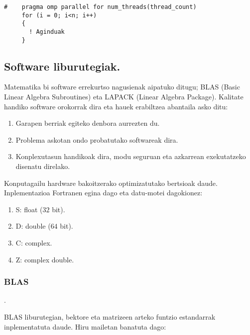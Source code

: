 \begin{lstlisting}
#    pragma omp parallel for num_threads(thread_count) 
     for (i = 0; i<n; i++)
     {
       ! Aginduak 
     }
\end{lstlisting}

\subsection{Software liburutegiak.}

Matematika bi software errekurtso nagusienak aipatuko ditugu; BLAS (Basic Linear Algebra Subroutines) eta LAPACK (Linear Algebra Package). Kalitate handiko software orokorrak dira eta hauek erabiltzea abantaila asko ditu: 

\begin{enumerate}
\item Garapen berriak egiteko denbora aurrezten du. 
\item Problema askotan ondo probatutako softwareak dira.
\item Konplexutasun handikoak dira, modu seguruan eta azkarrean exekutatzeko disenatu direlako. 
\end{enumerate}

Konputagailu hardware bakoitzerako optimizatutako bertsioak daude. Inplementazioa Fortranen egina dago eta datu-motei dagokionez:

\begin{enumerate}
\item S: float ($32$ bit).
\item D: double ($64$ bit).
\item C: complex.
\item Z: complex double.
\end{enumerate}   

\subsubsection*{\textbf{BLAS}}.

BLAS liburutegian, bektore eta matrizeen arteko funtzio estandarrak inplementatuta daude. Hiru mailetan banatuta dago: 

